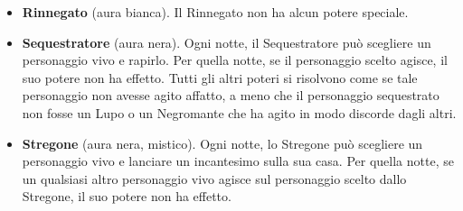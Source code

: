 \documentclass[a4paper,10pt]{article}
\begin{document}
\begin{itemize}
 \item {\bf Rinnegato} (aura bianca). Il Rinnegato non ha alcun potere speciale. %

 \item {\bf Sequestratore} (aura nera). Ogni notte, il Sequestratore può scegliere un personaggio vivo e rapirlo. Per quella notte, se il personaggio scelto agisce, il suo potere non ha effetto. Tutti gli altri poteri si risolvono come se tale personaggio non avesse agito affatto, a meno che il personaggio sequestrato non fosse un Lupo o un Negromante che ha agito in modo discorde dagli altri.
 
 

 \item {\bf Stregone} (aura nera, mistico). Ogni notte, lo Stregone può scegliere un personaggio vivo e lanciare un incantesimo sulla sua casa. Per quella notte, se un qualsiasi altro personaggio vivo agisce sul personaggio scelto dallo Stregone, il suo potere non ha effetto.
 
%  
 
 
\end{itemize}
\end{document}
